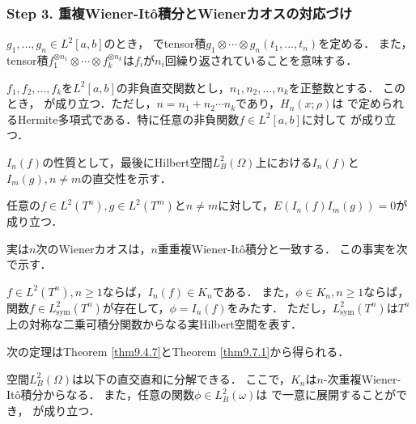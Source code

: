\subsubsection*{Step 3. 重複Wiener-It\^o積分とWienerカオスの対応づけ}
\begin{definition}%
$g_1,...,g_n\in L^2[a,b]$のとき，
でtensor積$g_1\otimes\cdots\otimes g_n(t_1,...,t_n)$を定める．
また，tensor積$f_1^{\otimes n_1}\otimes\cdots\otimes f_k^{\otimes n_k}$は$f_i$が$n_i$回繰り返されていることを意味する．
\end{definition}


\begin{theorem}\label{thm9.6.9}%
$f_1,f_2,...,f_k$を$L^2[a,b]$の非負直交関数とし，$n_1,n_2,...,n_k$を正整数とする．
このとき，
が成り立つ．ただし，$n=n_1+n_2\cdots n_k$であり，$H_{n}(x;\rho)$は
で定められるHermite多項式である．特に任意の非負関数$f\in L^2[a,b]$に対して
が成り立つ．
\end{theorem}

$I_n(f)$の性質として，最後にHilbert空間$L^2_B(\Omega)$上における$I_n(f)$と$I_m(g),n\neq m$の直交性を示す．
\begin{theorem}\label{thm9.6.10}%
任意の$f\in L^2(T^n),g\in L^2(T^m)$と$n\neq m$に対して，$E\left(I_n(f)I_m(g)\right)=0$が成り立つ．
\end{theorem}

実は$n$次のWienerカオスは，$n$重重複Wiener-It\^o積分と一致する．
この事実を次で示す．
\begin{theorem}\label{thm9.7.1}%
$f\in L^2(T^n),n\ge1$ならば，$I_n(f)\in K_n$である．
また，$\phi\in K_n,n\ge1$ならば，関数$f\in L^2_\mathrm{sym}(T^n)$が存在して，$\phi=I_n(f)$をみたす．
ただし，$L^2_\mathrm{sym}(T^n)$は$T^n$上の対称な二乗可積分関数からなる実Hilbert空間を表す．
\end{theorem}

次の定理はTheorem \ref{thm9.4.7}とTheorem \ref{thm9.7.1}から得られる．
\begin{theorem}[Wiener-It\^o]\label{thm9.7.3}%
空間$L^2_B(\Omega)$は以下の直交直和に分解できる．
ここで，$K_n$は$n$-次重複Wiener-It\^o積分からなる．
また，任意の関数$\phi\in L^2_B(\omega)$は
で一意に展開することができ，
が成り立つ．
\end{theorem}

